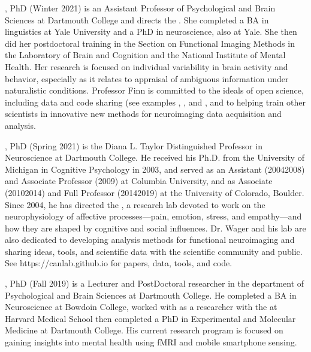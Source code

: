 \documentclass[letterpaper,10pt,english]{sphinxmanual}
\let\sphinxpxdimen\pdfpxdimen\else\newdimen\sphinxpxdimen
\begin{document}
\noindent\sphinxincludegraphics[width=200\sphinxpxdimen]{{finn}.jpg}

, PhD (Winter 2021) is an Assistant Professor of Psychological and Brain Sciences at Dartmouth College and directs the . She completed a BA in linguistics at Yale University and a PhD in neuroscience, also at Yale. She then did her postdoctoral training in the Section on Functional Imaging Methods in the Laboratory of Brain and Cognition and the National Institute of Mental Health. Her research is focused on individual variability in brain activity and behavior, especially as it relates to appraisal of ambiguous information under naturalistic conditions. Professor Finn is committed to the ideals of open science, including data and code sharing (see examples , , and , and to helping train other scientists in innovative new methods for neuroimaging data acquisition and analysis.

\noindent\sphinxincludegraphics[width=200\sphinxpxdimen]{{wager}.jpg}

, PhD (Spring 2021) is the Diana L. Taylor Distinguished Professor in Neuroscience at Dartmouth College. He received his Ph.D. from the University of Michigan in Cognitive Psychology in 2003, and served as an Assistant (2004\sphinxhyphen{}2008) and Associate Professor (2009) at Columbia University, and as Associate (2010\sphinxhyphen{}2014) and Full Professor (2014\sphinxhyphen{}2019) at the University of Colorado, Boulder. Since 2004, he has directed the , a research lab devoted to work on the neurophysiology of affective processes—pain, emotion, stress, and empathy—and how they are shaped by cognitive and social influences. Dr. Wager and his lab are also dedicated to developing analysis methods for functional neuroimaging and sharing ideas, tools, and scientific data with the scientific community and public. See https://canlab.github.io for papers, data, tools, and code.

\noindent\sphinxincludegraphics[width=200\sphinxpxdimen]{{huckins}.jpg}

, PhD (Fall 2019) is a Lecturer and Post\sphinxhyphen{}Doctoral researcher in the department of Psychological and Brain Sciences at Dartmouth College. He completed a BA in Neuroscience at Bowdoin College, worked with as a researcher with the  at Harvard Medical School then completed a PhD in Experimental and Molecular Medicine at Dartmouth College. His current research program is focused on gaining insights into mental health using fMRI and mobile smartphone sensing.
\end{document}
